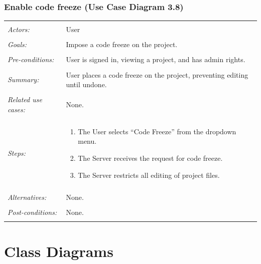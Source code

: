 \documentclass[11pt]{report}
\begin{document}
\subsection{Enable code freeze (Use Case Diagram 3.8)}
    \begin{tabular}{ p{2cm} p{12cm} }
     \hline
     \\
     \textit{Actors:} & User \\ 
     \\
     \textit{Goals:} & Impose a code freeze on the project. \\
     \\
     \textit{Pre-conditions:} & User is signed in, viewing a project, and has admin rights.\\
     \\
     \textit{Summary:} & User places a code freeze on the project, preventing editing until undone. \\
     \\
     \textit{Related use cases:} & None. \\ 
     \\
     \textit{Steps:} & \begin{enumerate}
        \item The User selects ``Code Freeze'' from the dropdown menu.
        \item The Server receives the request for code freeze.
        \item The Server restricts all editing of project files.
     \end{enumerate} \\
     \\
     \textit{Alternatives:} & None. \\
     \\
     \textit{Post-conditions:} & None. \\
     \\
    \hline
\end{tabular}



\chapter{Class Diagrams}
\end{document}
